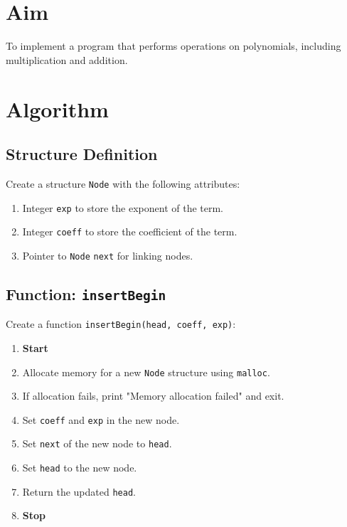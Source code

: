 
\section{Aim}
To implement a program that performs operations on polynomials, including multiplication and addition.

\section{Algorithm}
 {\selectfont

  \subsection{Structure Definition}
  Create a structure \texttt{Node} with the following attributes:
  \begin{enumerate}[label=\arabic*:,left=0pt]
    \item Integer \texttt{exp} to store the exponent of the term.
    \item Integer \texttt{coeff} to store the coefficient of the term.
    \item Pointer to \texttt{Node} \texttt{next} for linking nodes.
  \end{enumerate}

  \subsection{Function: \texttt{insertBegin}}
  Create a function \texttt{insertBegin(head, coeff, exp)}:
  \begin{enumerate}[label=\arabic*:,left=0pt]
    \item \textbf{Start}
    \item Allocate memory for a new \texttt{Node} structure using \texttt{malloc}.
    \item If allocation fails, print "Memory allocation failed" and exit.
    \item Set \texttt{coeff} and \texttt{exp} in the new node.
    \item Set \texttt{next} of the new node to \texttt{head}.
    \item Set \texttt{head} to the new node.
    \item Return the updated \texttt{head}.
    \item \textbf{Stop}
  \end{enumerate}

}
